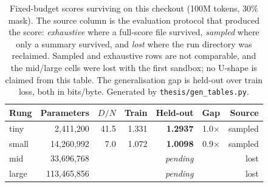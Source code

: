 \begin{table}[htbp]
\centering
\caption{Fixed-budget scores surviving on this checkout (100M tokens, 30\%
mask). The source column is the evaluation protocol that produced the score:
\emph{exhaustive} where a full-score file survived, \emph{sampled} where only a
summary survived, and \emph{lost} where the run directory was reclaimed. Sampled
and exhaustive rows are not comparable, and the mid/large cells were lost with
the first sandbox; no U-shape is claimed from this table. The generalisation gap
is held-out over train loss, both in bits/byte. Generated by
\texttt{thesis/gen\_tables.py}.}
\label{tab:fixed-d}
\begin{tabular}{lrrrrrr}
\toprule
Rung & Parameters & $D/N$ & Train & Held-out & Gap & Source \\
\midrule
tiny & 2{,}411{,}200 & 41.5 & 1.331 & \textbf{1.2937} & 1.0$\times$ & sampled \\
small & 14{,}260{,}992 & 7.0 & 1.072 & \textbf{1.0098} & 0.9$\times$ & sampled \\
mid & 33{,}696{,}768 & & & \emph{pending} & & lost \\
large & 113{,}465{,}856 & & & \emph{pending} & & lost \\
\bottomrule
\end{tabular}
\end{table}
